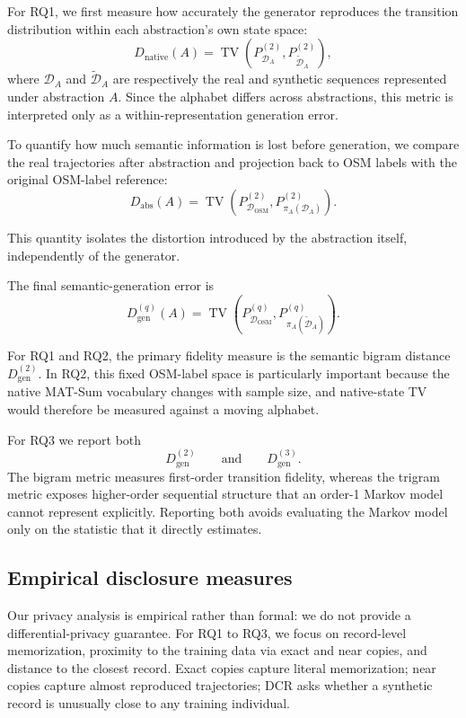 \documentclass[sigconf,nonacm]{acmart}
\begin{document}
For RQ1, we first measure how accurately the generator reproduces the transition distribution within each abstraction's own state space:
%
\[
    D_{\mathrm{native}}(A)
    =
    \operatorname{TV}
    \left(
        P_{\mathcal{D}_A}^{(2)},
        P_{\widetilde{\mathcal{D}}_A}^{(2)}
    \right),
\]
%
where $\mathcal{D}_A$ and $\widetilde{\mathcal{D}}_A$ are respectively the real and synthetic sequences represented under abstraction $A$.
Since the alphabet differs across abstractions, this metric is
interpreted only as a within-representation generation error.

To quantify how much semantic information is lost before generation, we compare the real trajectories after abstraction and projection back to OSM labels with the original OSM-label reference:
%
\[
    D_{\mathrm{abs}}(A)
    =
    \operatorname{TV}
    \left(
        P_{\mathcal{D}_{\mathrm{OSM}}}^{(2)},
        P_{\pi_A(\mathcal{D}_A)}^{(2)}
    \right).
\]

This quantity isolates the distortion introduced by the abstraction itself, independently of the generator.

The final semantic-generation error is
%
\[
    D_{\mathrm{gen}}^{(q)}(A)
    =
    \operatorname{TV}
    \left(
        P_{\mathcal{D}_{\mathrm{OSM}}}^{(q)},
        P_{\pi_A(\widetilde{\mathcal{D}}_A)}^{(q)}
    \right).
\]

For RQ1 and RQ2, the primary fidelity measure is the semantic bigram distance $D_{\mathrm{gen}}^{(2)}$. In RQ2, this fixed OSM-label space is particularly important because the native MAT-Sum vocabulary changes with sample size, and native-state TV would therefore be measured against a moving alphabet.

For RQ3 we report both
%
\[
    D_{\mathrm{gen}}^{(2)}
    \qquad\text{and}\qquad
    D_{\mathrm{gen}}^{(3)}.
\]
%
The bigram metric measures first-order transition fidelity, whereas the trigram metric exposes higher-order sequential structure that an order-1 Markov model cannot represent explicitly. Reporting both avoids evaluating the Markov model only on the statistic that it directly estimates.

\subsection{Empirical disclosure measures}
\label{sec:privacy-metrics}

Our privacy analysis is empirical rather than formal: we do not provide a differential-privacy guarantee. For RQ1 to RQ3, we focus on record-level memorization, proximity to the training data via exact and near copies, and distance to the closest record. 
Exact copies capture literal memorization; near copies capture almost reproduced trajectories; DCR asks whether a synthetic record is unusually close to any training individual.
\end{document}
